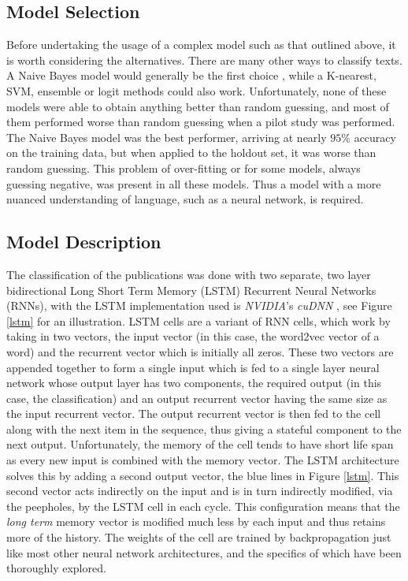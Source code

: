 \documentclass[12pt, a4paper]{article}
\begin{document}
 \subsection{Model Selection}\label{ness}
 
 Before undertaking the usage of a complex model such as that outlined above, it is worth considering the alternatives. There are many other ways to classify texts. A Naive Bayes model would generally be the first choice \citep{mccallum1998comparison}, while a K-nearest, SVM, ensemble or logit methods could also work. Unfortunately, none of these models were able to obtain anything better than random guessing, and most of them performed worse than random guessing when a pilot study was performed. The Naive Bayes model was the best performer, arriving at nearly $95\%$ accuracy on the training data, but when applied to the holdout set, it was worse than random guessing. This problem of over-fitting or for some models, always guessing negative, was present in all these models. Thus a model with a more nuanced understanding of language, such as a neural network, is required.
  
 \subsection{Model Description}

The classification of the publications was done with two separate, two layer bidirectional \citep{graves2013hybrid} Long Short Term Memory (LSTM) \citep{Hochreiter:1997:LSM:1246443.1246450} Recurrent Neural Networks (RNNs), with the LSTM implementation used is \textit{NVIDIA}'s \textit{cuDNN} \citep{chetlur2014cudnn}, see Figure \ref{lstm} for an illustration. LSTM cells are a variant of RNN cells, which work by taking in two vectors, the input vector (in this case, the word2vec vector of a word) and the recurrent vector which is initially all zeros. These two vectors are appended together to form a single input which is fed to a single layer neural network whose output layer has two components, the required output (in this case, the classification) and an output recurrent vector having the same size as the input recurrent vector. The output recurrent vector is then fed to the cell along with the next item in the sequence, thus giving a stateful component to the next output. Unfortunately, the memory of the cell tends to have short life span \citep{greff2017lstm} as every new input is combined with the memory vector. The LSTM architecture solves this by adding a second output vector, the blue lines in Figure \ref{lstm}. This second vector acts indirectly on the input and is in turn indirectly modified, via the peepholes, by the LSTM cell in each cycle. This configuration means that the \textit{long term} memory vector is modified much less by each input and thus retains more of the history. The weights of the cell are trained by backpropagation\citep{pytorch} just like most other neural network architectures, and the specifics of which have been thoroughly explored\citep{riedmiller1993direct}.
\end{document}
